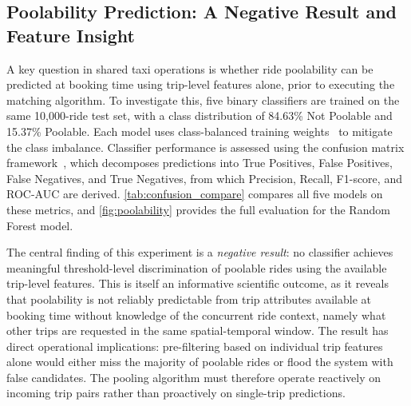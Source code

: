 \documentclass[a4paper,fleqn]{cas-dc}
\begin{document}
\subsection{Poolability Prediction: A Negative Result and Feature Insight}
\label{sec:pool_eval}

A key question in shared taxi operations is whether ride poolability can be predicted at booking time using trip-level features alone, prior to executing the matching algorithm.  To investigate this, five binary classifiers are trained on the same 10{,}000-ride test set, with a class distribution of 84.63\% Not Poolable and 15.37\% Poolable.  Each model uses class-balanced training weights~\cite{scikit-learn} to mitigate the class imbalance.  Classifier performance is assessed using the confusion matrix framework~\cite{powers2011evaluation,scikit-learn}, which decomposes predictions into True Positives, False Positives, False Negatives, and True Negatives, from which Precision, Recall, F1-score, and ROC-AUC are derived.  \autoref{tab:confusion_compare} compares all five models on these metrics, and \autoref{fig:poolability} provides the full evaluation for the Random Forest model.

The central finding of this experiment is a \emph{negative result}: no classifier achieves meaningful threshold-level discrimination of poolable rides using the available trip-level features.  This is itself an informative scientific outcome, as it reveals that poolability is not reliably predictable from trip attributes available at booking time without knowledge of the concurrent ride context, namely what other trips are requested in the same spatial-temporal window.  The result has direct operational implications: pre-filtering based on individual trip features alone would either miss the majority of poolable rides or flood the system with false candidates.  The pooling algorithm must therefore operate reactively on incoming trip pairs rather than proactively on single-trip predictions.
\end{document}
